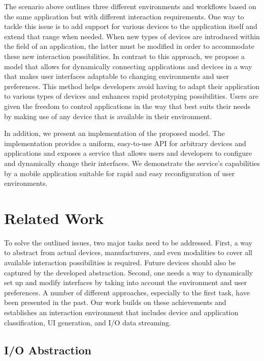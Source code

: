 \documentclass[twoside,twocolumn,10pt]{article}
\begin{document}
%
%
The scenario above outlines three different environments and workflows based on the same application but with different interaction requirements. One way to tackle this issue is to add support for various devices to the application itself and extend that range when needed. When new types of devices are introduced within the field of an application, the latter must be modified in order to accommodate these new interaction possibilities. In contrast to this approach, we propose a model that allows for dynamically connecting applications and devices in a way that makes user interfaces adaptable to changing environments and user preferences. This method helps developers avoid having to adapt their application to various types of devices and enhances rapid prototyping possibilities. Users are given the freedom to control applications in the way that best suits their needs by making use of any device that is available in their environment.

In addition, we present an implementation of the proposed model. The implementation provides a uniform, easy-to-use API for arbitrary devices and applications and exposes a service that allows users and developers to configure and dynamically change their interfaces. We demonstrate the service's capabilities by a mobile application suitable for rapid and easy reconfiguration of user environments.




\section{Related Work}

To solve the outlined issues, two major tasks need to be addressed. First, a way to abstract from actual devices, manufacturers, and even modalities to cover all available interaction possibilities is required. Future devices should also be captured by the developed abstraction. Second, one needs a way to dynamically set up and modify interfaces by taking into account the environment and user preferences. A number of different approaches, especially to the first task, have been presented in the past. Our work builds on these achievements and establishes an interaction environment that includes device and application classification, UI generation, and I/O data streaming.


\subsection{I/O Abstraction}
\end{document}
